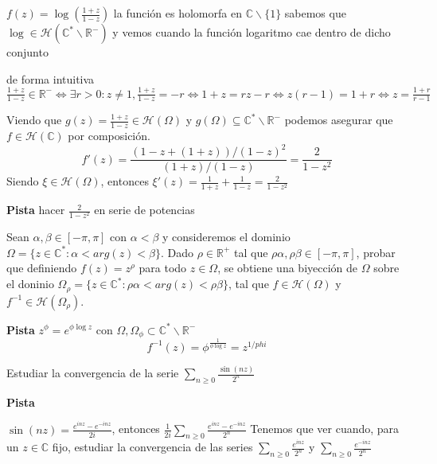 \begin{sol}
	
	$f(z) = \log(\frac{1+z}{1-z})$
	la función es holomorfa en $\mathbb{C}\backslash \{1\}$
	sabemos que $\log \in \mathcal{H}(\mathbb{C}^{\ast}\backslash\mathbb{R}^-)$
	y vemos cuando la función logaritmo cae dentro de dicho conjunto
	
	de forma intuitiva
	$\frac{1+z}{1-z} \in\mathbb{R}^- \Longleftrightarrow \exists r>0 : z\not=1, \frac{1+z}{1-z} = -r \Longleftrightarrow 1+z = rz-r \Longleftrightarrow z(r-1)=1+r \Longleftrightarrow z = \frac{1+r}{r-1}$
	
	Viendo que
	$g(z) = \frac{1+z}{1-z} \in\mathcal{H}(\Omega)$ y $g(\Omega) \subseteq \mathbb{C}^{\ast}\backslash \mathbb{R}^-$
	podemos asegurar que $f\in\mathcal{H}(\mathbb{C})$ por composición.
	$$f'(z) = \frac{ (1-z+(1+z))/(1-z)^2 }{ (1+z)/(1-z) } = \frac{2}{1-z^2}$$
	Siendo $\xi\in\mathcal{H}(\Omega)$, entonces
	$\xi '(z) = \frac{1}{1+z} + \frac{1}{1-z} = \frac{2}{1-z^2}$
	
	
	
	\textbf{Pista}
	hacer $\frac{2}{1-z^2}$ en serie de potencias
\end{sol}





\begin{ejer}
	Sean $\alpha,\beta\in [-\pi,\pi]$ con $\alpha < \beta$ y consideremos el dominio $\Omega = \{ z\in\mathbb{C}^{\ast} : \alpha < arg(z) < \beta \}$. Dado $\rho\in\mathbb{R}^+$ tal que $\rho\alpha,\rho\beta\in[-\pi,\pi]$, probar que definiendo $f(z) = z^{\rho}$ para todo $z\in\Omega$, se obtiene una biyección de $\Omega$ sobre el doninio $\Omega_{\rho} = \{ z\in\mathbb{C}^{\ast} : \rho\alpha < arg(z) < \rho\beta \}$, tal que $f\in\mathcal{H}(\Omega)$ y $f^{-1}\in\mathcal{H}(\Omega_{\rho})$.
\end{ejer}
\textbf{Pista}
$z^{\phi} = e^{ \phi \log z}$ con $\Omega,\Omega_{\phi} \subset \mathbb{C}^{\ast}\backslash \mathbb{R^-}$
$$f^{-1}(z) = \phi^{\frac{1}{\phi\log z}} = z^{1/{phi}}$$


\begin{ejer}
	Estudiar la convergencia de la serie $\sum_{n\geq 0} \frac{\sin(nz)}{2^n}$
\end{ejer}
\textbf{Pista}

$\sin(nz) = \frac{e^{inz}-e^{-inz}}{2i}$, entonces
$\frac{1}{2i} \sum_{n\geq 0} \frac{e^{inz}-e^{-inz}}{2^n}$
Tenemos que ver cuando, para un $z\in\mathbb{C}$ fijo, estudiar la convergencia de las series
$\sum_{n\geq 0} \frac{e^{inz}}{2^n}$ y $\sum_{n\geq 0} \frac{e^{-inz}}{2^n}$

